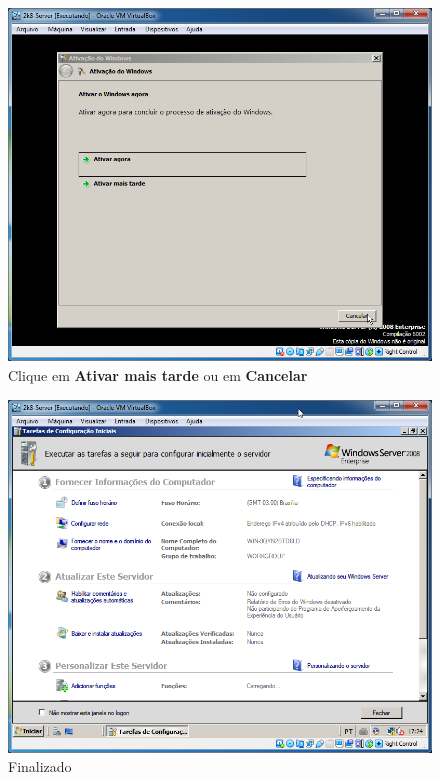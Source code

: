 \documentclass[10pt]{article}
\begin{document}
\begin{figure}[H]
    \centering
    \caption{Clique em \textbf{Ativar mais tarde} ou em \textbf{Cancelar}}
    \label{fig:3145}
    \includegraphics[width=\linewidth]{images/ativacao_das_maquinas_virtuais/configuracao_inicial_das_maquinas_virtuais/045.png}
\end{figure}
\begin{figure}[H]
    \centering
    \caption{Finalizado}
    \label{fig:3146}
    \includegraphics[width=\linewidth]{images/ativacao_das_maquinas_virtuais/configuracao_inicial_das_maquinas_virtuais/046.png}
\end{figure}
\end{document}
